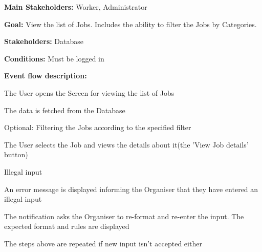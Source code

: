 				\noindent {}
				\begin{packed_item}
					\item \textbf{Main Stakeholders:} Worker, Administrator
					\item \textbf{Goal:} View the list of Jobs. Includes the ability to filter the Jobs by Categories.
					\item \textbf{Stakeholders: } Database
					\item \textbf{Conditions: } Must be logged in
					\item \textbf{Event flow description: }
					\begin{packed_enum}
						\item The User opens the Screen for viewing the list of Jobs
						\item The data is fetched from the Database
						\item Optional: Filtering the Jobs according to the specified filter
						\item The User selects the Job and views the details about it(the 'View Job details' button)
					\end{packed_enum}
					
					\begin{packed_item}
						\item[2.a] Illegal input
						\item[] \begin{packed_enum}
							\item An error message is displayed informing the Organiser that they have entered an illegal input
							\item The notification asks the Organiser to re-format and re-enter the input. The expected format and rules are displayed
							\item The steps above are repeated if new input isn't accepted either
						\end{packed_enum}
					\end{packed_item}
				
				\end{packed_item}
			
